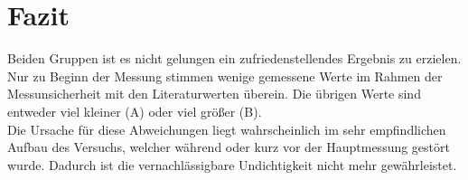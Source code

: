 \documentclass[12pt,a4paper]{article}
\begin{document}
\section{Fazit}
Beiden Gruppen ist es nicht gelungen ein zufriedenstellendes Ergebnis zu erzielen. Nur zu Beginn der Messung stimmen wenige gemessene Werte im Rahmen der Messunsicherheit mit den Literaturwerten überein. Die übrigen Werte sind entweder viel kleiner (A) oder viel größer (B).\\
Die Ursache für diese Abweichungen liegt wahrscheinlich im sehr empfindlichen Aufbau des Versuchs, welcher  während oder kurz vor der Hauptmessung gestört wurde. Dadurch ist die vernachlässigbare Undichtigkeit nicht mehr gewährleistet. 
\end{document}
